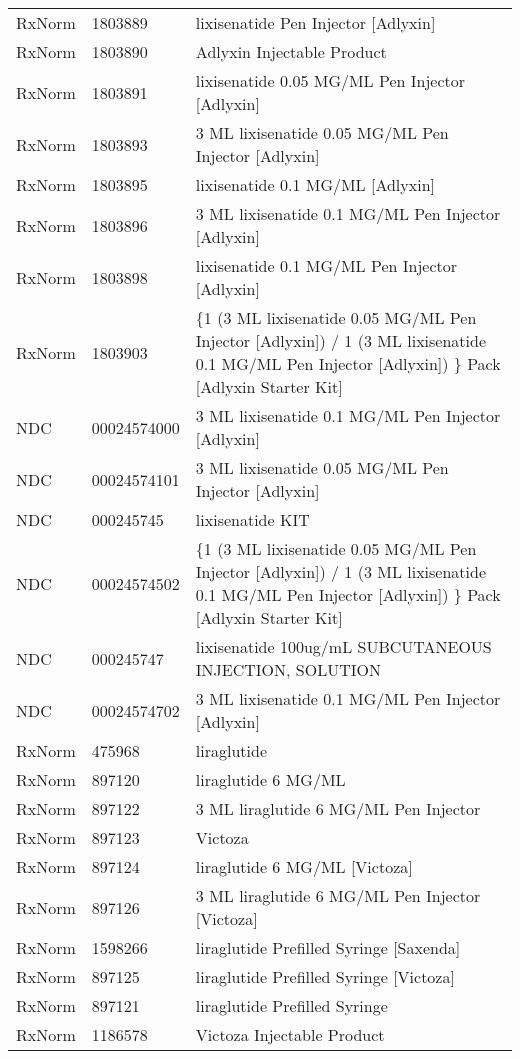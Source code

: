 \begin{longtable}{p{}p{}p{}}
  RxNorm & 1803889 & lixisenatide Pen Injector [Adlyxin] \\ 
  RxNorm & 1803890 & Adlyxin Injectable Product \\ 
  RxNorm & 1803891 & lixisenatide 0.05 MG/ML Pen Injector [Adlyxin] \\ 
  RxNorm & 1803893 & 3 ML lixisenatide 0.05 MG/ML Pen Injector [Adlyxin] \\ 
  RxNorm & 1803895 & lixisenatide 0.1 MG/ML [Adlyxin] \\ 
  RxNorm & 1803896 & 3 ML lixisenatide 0.1 MG/ML Pen Injector [Adlyxin] \\ 
  RxNorm & 1803898 & lixisenatide 0.1 MG/ML Pen Injector [Adlyxin] \\ 
  RxNorm & 1803903 & \{1 (3 ML lixisenatide 0.05 MG/ML Pen Injector [Adlyxin]) / 1 (3 ML lixisenatide 0.1 MG/ML Pen Injector [Adlyxin]) \} Pack [Adlyxin Starter Kit] \\ 
  NDC & 00024574000 & 3 ML lixisenatide 0.1 MG/ML Pen Injector [Adlyxin] \\ 
  NDC & 00024574101 & 3 ML lixisenatide 0.05 MG/ML Pen Injector [Adlyxin] \\ 
  NDC & 000245745 & lixisenatide KIT \\ 
  NDC & 00024574502 & \{1 (3 ML lixisenatide 0.05 MG/ML Pen Injector [Adlyxin]) / 1 (3 ML lixisenatide 0.1 MG/ML Pen Injector [Adlyxin]) \} Pack [Adlyxin Starter Kit] \\ 
  NDC & 000245747 & lixisenatide 100ug/mL SUBCUTANEOUS INJECTION, SOLUTION \\ 
  NDC & 00024574702 & 3 ML lixisenatide 0.1 MG/ML Pen Injector [Adlyxin] \\ 
  RxNorm & 475968 & liraglutide \\ 
  RxNorm & 897120 & liraglutide 6 MG/ML \\ 
  RxNorm & 897122 & 3 ML liraglutide 6 MG/ML Pen Injector \\ 
  RxNorm & 897123 & Victoza \\ 
  RxNorm & 897124 & liraglutide 6 MG/ML [Victoza] \\ 
  RxNorm & 897126 & 3 ML liraglutide 6 MG/ML Pen Injector [Victoza] \\ 
  RxNorm & 1598266 & liraglutide Prefilled Syringe [Saxenda] \\ 
  RxNorm & 897125 & liraglutide Prefilled Syringe [Victoza] \\ 
  RxNorm & 897121 & liraglutide Prefilled Syringe \\ 
  RxNorm & 1186578 & Victoza Injectable Product \\ 

\end{longtable}
